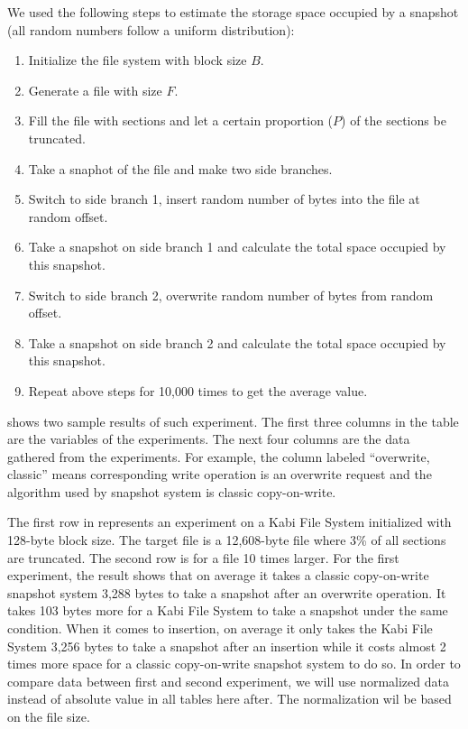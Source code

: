     We used the following steps to estimate the storage space occupied by a snapshot (all random numbers follow a uniform distribution):

\begin{enumerate}

	\item Initialize the file system with block size $B$.

	\item Generate a file with size $F$.

	\item Fill the file with sections and let a certain proportion ($P$) of the sections be truncated.

	\item Take a snaphot of the file and make two side branches.
	
	\item Switch to side branch 1, insert random number of bytes into the file at random offset.

	\item Take a snapshot on side branch 1 and calculate the total space occupied by this snapshot.

	\item Switch to side branch 2, overwrite random number of bytes from random offset.

	\item Take a snapshot on side branch 2 and calculate the total space occupied by this snapshot.

	\item Repeat above steps for 10,000 times to get the average value.

\end{enumerate}

     shows two sample results of such experiment. The first three columns in the table are the variables of the experiments. The next four columns are the data gathered from the experiments. For example, the column labeled ``overwrite, classic'' means corresponding write operation is an overwrite request and the algorithm used by snapshot system is classic copy-on-write.

    The first row in  represents an experiment on a Kabi File System initialized with 128-byte block size. The target file is a 12,608-byte file where 3\% of all sections are truncated. The second row is for a file 10 times larger. For the first experiment, the result shows that on average it takes a classic copy-on-write snapshot system 3,288 bytes to take a snapshot after an overwrite operation. It takes 103 bytes more for a Kabi File System to take a snapshot under the same condition. When it comes to insertion, on average it only takes the Kabi File System 3,256 bytes to take a snapshot after an insertion while it costs almost 2 times more space for a classic copy-on-write snapshot system to do so. In order to compare data between first and second experiment, we will use normalized data instead of absolute value in all tables here after. The normalization wil be based on the file size.

